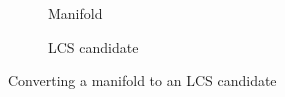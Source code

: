 \begin{figure}[htpb]
\centering
    \begin{subfigure}[b]{0.475\textwidth}
        \centering
        \caption[]{{\small Manifold}}
        \label{fig:u0_dom_err_dp54}
    \end{subfigure}
    \begin{subfigure}[b]{0.475\textwidth}
        \centering
        \caption[]{{\small LCS candidate}}
        \label{fig:u0_dom_err_dp87}
    \end{subfigure}
\caption[Veni, vidi, Aviici]{Converting a manifold to an LCS candidate}
    \label{fig:u0_dom_errs}
\end{figure}

